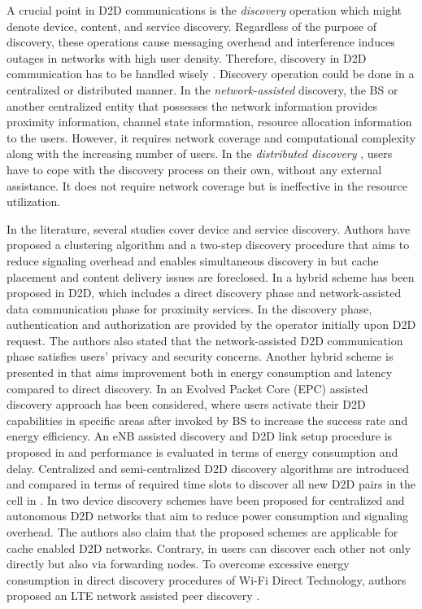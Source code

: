 \documentclass[10pt,a4paper,twocolumn]{article}
\begin{document}
A crucial point in D2D communications is the \emph{discovery} operation which might denote device, content, and service discovery. Regardless of the purpose of discovery, these operations cause messaging overhead and interference induces outages in networks with high user density. Therefore, discovery in D2D communication has to be handled wisely \cite{chiasserini2015content}. Discovery operation could be done in a centralized or distributed manner. In the \emph{network-assisted}  discovery, the BS or another centralized entity that possesses the network information provides proximity information, channel state information, resource allocation information to the users. However, it requires network coverage and computational complexity along with the increasing number of users. In the \emph{distributed discovery} , users have to cope with the discovery process on their own, without any external assistance. It does not require network coverage but is ineffective in the resource utilization.

In the literature, several studies cover device and service discovery. Authors have proposed a clustering algorithm and a two-step discovery procedure that aims to reduce signaling overhead and enables simultaneous discovery in \cite{swain2020novel} but cache placement and content delivery issues are foreclosed. In \cite{Gunes_2014} a hybrid scheme has been proposed in D2D, which includes a direct discovery phase and network-assisted data communication phase for proximity services. In the discovery phase, authentication and authorization are provided by the operator initially upon D2D request. The authors also stated that the network-assisted D2D communication phase satisfies users' privacy and security concerns. Another hybrid scheme is presented in \cite{LiDiscovery2018} that aims improvement both in energy consumption and latency compared to direct discovery. In \cite{Prasad2014} an Evolved Packet Core (EPC) assisted discovery approach has been considered, where users activate their D2D capabilities in specific areas after invoked by BS to increase the success rate and energy efficiency. An eNB assisted discovery and D2D link setup procedure is proposed in \cite{Hong_2013} and performance is evaluated in terms of energy consumption and delay. Centralized and semi-centralized D2D discovery algorithms are introduced and compared in terms of required time slots to discover all new D2D pairs in the cell in \cite{Thanos_2013}. In \cite{ParkDiscovery2017} two device discovery schemes have been proposed for centralized and autonomous D2D networks that aim to reduce power consumption and signaling overhead. The authors also claim that the proposed schemes are applicable for cache enabled D2D networks. Contrary, in \cite{Xu2018Discovery} users can discover each other not only directly but also via forwarding nodes. To overcome excessive energy consumption in direct discovery procedures of Wi-Fi Direct Technology, authors proposed an LTE network assisted peer discovery \cite{PyattaevWiFiDirectDiscoveryLTE}.
\end{document}
